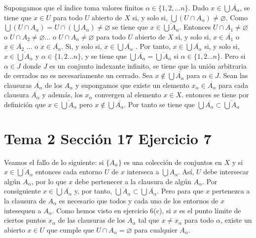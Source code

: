 \documentclass{article}
\begin{document}
Supongamos que el índice toma valores finitos $\alpha\in \{1,2,...n\}$. Dado $x\in \bigcup\overline{A_\alpha}$, se tiene que $x\in U$ para todo $U$ abierto de $X$ si, y solo si, $\bigcup (U\cap A_\alpha)\neq\varnothing$. Como $\bigcup (U\cap A_\alpha)=U\cap\left( \bigcup A_\alpha\right)\neq\varnothing$ se tiene que $x\in \overline{\bigcup A_\alpha} $. Entonces $U\cap A_1\neq\varnothing$ o $U\cap A_2\neq\varnothing$... o $U\cap A_n\neq\varnothing$ para todo $U$ abierto de $ X$ si, y solo si, $x\in \overline{A_1}$ o $x\in \overline{A_2}$ ... o $x\in \overline{A_n}$. Si, y solo si, $x\in \bigcup \overline{A_\alpha}$ . Por tanto, $x\in \bigcup \overline{A_\alpha}$ si, y solo si, $x \in\overline{\bigcup A_\alpha}$ y $\alpha \in \{1,2...n\}$, y se tiene que $\bigcup\overline{ A_\alpha}=\overline{\bigcup A_\alpha}$ si $\alpha \in \{1,2...n\}$. Pero si $\alpha\in J$ donde $J$ es un conjunto indexante infinito, se tiene que la unión arbitraria de cerrados no es necesariamente un cerrado. Sea $x\notin\bigcup\overline{ A_\alpha}$ para $\alpha\in J$. Sean las clausuras $\overline{A_\alpha}$ de los $A_\alpha$ y supongamos que existe un elemento $x_\alpha\in \overline{A_\alpha}$ para cada clausura $\overline{A_\alpha}$ y además, los $x_\alpha$ convergen al elemento $x\in X$. entonces se tiene por definición que $x\in \overline{\bigcup A_\alpha}$ pero $x\notin \bigcup \overline{A_\alpha}$. Por tanto se tiene que $\bigcup \overline{A_\alpha}\subset\overline{\bigcup A_\alpha}$
\section{Tema 2 Sección 17 Ejercicio 7}
Veamos el fallo de lo siguiente: si $\{A_\alpha\}$ es una colección de conjuntos en $X$ y si $x\in \overline{\bigcup A_\alpha}$ entonces cada entorno $U$ de $x$ interseca a $\bigcup A_\alpha$. Así, $U$ debe intersecar algún $A_\alpha$, por lo que $x$ debe pertenecer a la clausura de algún $A_\alpha$. Por consiguiente $x\in \bigcup\overline{A_\alpha}$ y, por tanto, $\overline{\bigcup A_\alpha}\subset\bigcup\overline{A_\alpha}$. Pero para que $x$ pertenezca a la clausura de $A_\alpha$ es necesario que todos y cada uno de los entornos de $x$ intesequen a $A_\alpha$. Como hemos visto en ejercicio 6(c), si $x$ es el punto límite de ciertos puntos $x_\alpha$ de las clausuras de los $A_\alpha$ tal que $x\neq x_\alpha$ para todo $\alpha$, existe un abierto $x\in U$ que cumple que $U\cap A_\alpha=\varnothing$ para cualquier $A_\alpha$.
\end{document}
